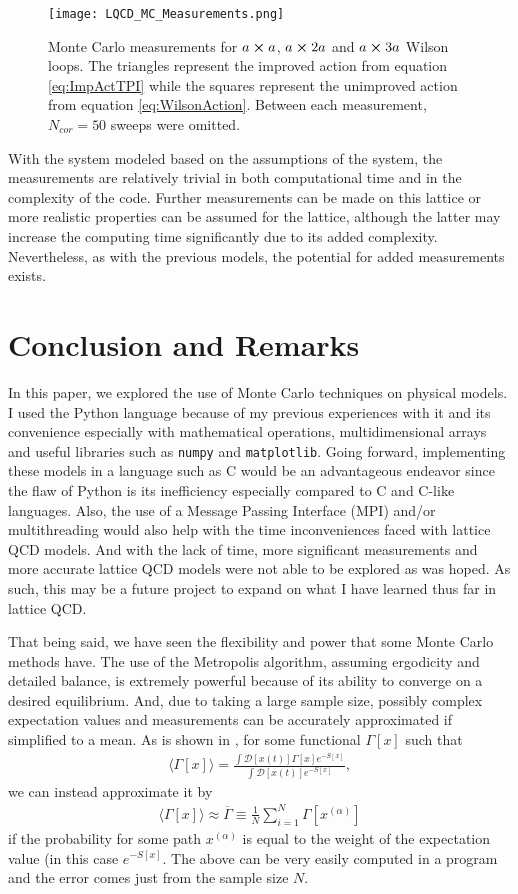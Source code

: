 \documentclass[11pt]{article}
\begin{document}
\begin{figure}[h!]
	\centering
	\texttt{[image: LQCD\_MC\_Measurements.png]}
	\caption{Monte Carlo measurements for $a\cross a$, $a\cross2a$ and $a\cross3a$ Wilson loops. The triangles represent the improved action from equation \ref{eq:ImpActTPI} while the squares represent the unimproved action from equation \ref{eq:WilsonAction}. Between each measurement, $N_{cor}=50$ sweeps were omitted.}
	\label{fig:LQCDPlot}
\end{figure}

With the system modeled based on the assumptions of the system, the measurements are relatively trivial in both computational time and in the complexity of the code. Further measurements can be made on this lattice or more realistic properties can be assumed for the lattice, although the latter may increase the computing time significantly due to its added complexity. Nevertheless, as with the previous models, the potential for added measurements exists.

\section{Conclusion and Remarks}
In this paper, we explored the use of Monte Carlo techniques on physical models. I used the Python language because of my previous experiences with it and its convenience especially with mathematical operations, multidimensional arrays and useful libraries such as \texttt{numpy} and \texttt{matplotlib}. Going forward, implementing these models in a language such as C would be an advantageous endeavor since the flaw of Python is its inefficiency especially compared to C and C-like languages. Also, the use of a Message Passing Interface (MPI) and/or multithreading would also help with the time inconveniences faced with lattice QCD models. And with the lack of time, more significant measurements and more accurate lattice QCD models were not able to be explored as was hoped. As such, this may be a future project to expand on what I have learned thus far in lattice QCD.

That being said, we have seen the flexibility and power that some Monte Carlo methods have. The use of the Metropolis algorithm, assuming ergodicity and detailed balance, is extremely powerful because of its ability to converge on a desired equilibrium. And, due to taking a large sample size, possibly complex expectation values and measurements can be accurately approximated if simplified to a mean. As is shown in \cite{MainPaper}, for some functional $\Gamma[x]$ such that
\begin{align}
	\langle\Gamma[x]\rangle=\frac{\int\mathcal{D}[x(t)]\Gamma[x]e^{-S[x]}}{\int\mathcal{D}[x(t)]e^{-S[x]}},
\end{align}
we can instead approximate it by
\begin{align}
	\langle\Gamma[x]\rangle\approx\overline{\Gamma}\equiv\frac{1}{N}\sum_{i=1}^N\Gamma[x^{(\alpha)}]
\end{align}
if the probability for some path $x^{(\alpha)}$ is equal to the weight of the expectation value (in this case $e^{-S[x]}$. The above can be very easily computed in a program and the error comes just from the sample size $N$.
\end{document}
